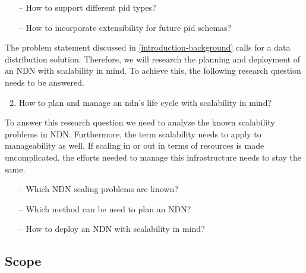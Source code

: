 
\begin{itemize}
    \item[--] How to support different \gls{pid} types?
    \item[--] How to incorporate extensibility for future \gls{pid} schemas?
\end{itemize}

The problem statement discussed in \ref{introduction-background} calls for a data distribution solution. Therefore, we will research the planning and deployment of an NDN with scalability in mind. To achieve this, the following research question needs to be answered.
\begin{enumerate}
\setcounter{enumi}{1}
    \item How to plan and manage an \gls{ndn}'s life cycle with scalability in mind?
\end{enumerate}

To answer this research question we need to analyze the known scalability problems in NDN. Furthermore, the term scalability needs to apply to manageability as well. If scaling in or out in terms of resources is made uncomplicated, the efforts needed to manage this infrastructure needs to stay the same.
\begin{itemize}
    \item[--] Which NDN scaling problems are known?
    \item[--] Which method can be used to plan an NDN?
    \item[--] How to deploy an NDN with scalability in mind?
\end{itemize}

\subsection{Scope}
\label{introduction-scope}

